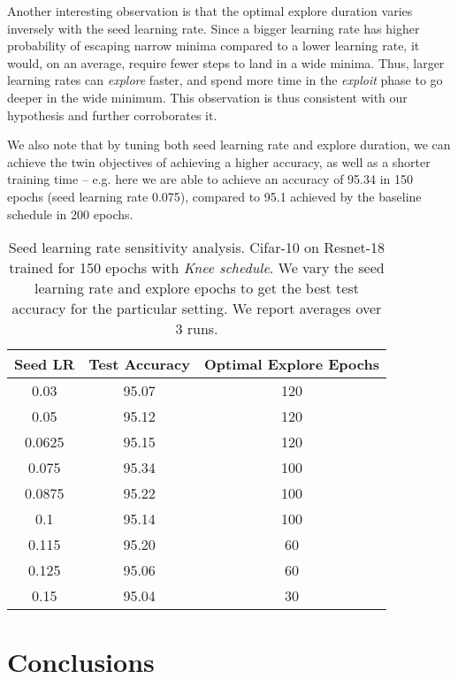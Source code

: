 \documentclass[twoside,11pt]{article}
\newcommand{\lrschedule}{\textit{Knee schedule}}
\begin{document}
Another interesting observation is that the optimal explore duration varies inversely with the seed learning rate. Since a bigger learning rate has higher probability of escaping narrow minima compared to a lower learning rate, it would, on an average, require fewer steps to land in a wide minima. Thus, larger learning rates can \textit{explore} faster, and spend more time in the \textit{exploit} phase to go deeper in the wide minimum. This observation is thus consistent with our hypothesis and further corroborates it.

We also note that by tuning both seed learning rate and explore duration, we can achieve the twin objectives of achieving a higher accuracy, as well as a shorter training time -- e.g. here we are able to achieve an accuracy of 95.34 in 150 epochs (seed learning rate 0.075), compared to 95.1 achieved by the baseline schedule in 200 epochs.

\begin{table}[h]
\small
\centering
\caption{Seed learning rate sensitivity analysis. Cifar-10 on Resnet-18 trained for 150 epochs with \lrschedule{}. We vary the seed learning rate and explore epochs to get the best test accuracy for the particular setting. We report averages over 3 runs.}
\label{tab:seed_senstivity_cifar}

\begin{tabular}{ccc}
  \toprule
  Seed LR        &  Test Accuracy & Optimal Explore Epochs   \\
\midrule
  0.03   & 95.07 & 120\\ 
  0.05   & 95.12 & 120 \\ 
  0.0625    & 95.15 & 120\\ 
  0.075   & 95.34 & 100 \\ 
  0.0875   & 95.22 & 100\\ 
  0.1 & 95.14 & 100 \\
  0.115   & 95.20 & 60\\ 
  0.125   & 95.06 & 60 \\ 
  0.15   & 95.04 & 30 \\ 
 \bottomrule
\end{tabular}

\end{table}
 
\section{Conclusions} \label{sec:conclusions}
\end{document}
